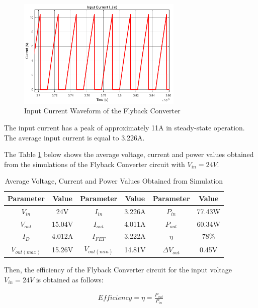 \begin{figure}[H]
\begin{center}
\includegraphics[width=0.7\textwidth]{figures/I_in_24.png}
\caption{Input Current Waveform of the Flyback Converter}
\label{fig:Iin24}
\end{center}
\end{figure}

The input current has a peak of approximately 11A in steady-state operation. The average input current is equal to 3.226A.

The Table \ref{tab:sim24} below shows the average voltage, current and power values obtained from the simulations of the Flyback Converter circuit with $V_{in} = 24V$. 

\begin{table}[H]
    \centering
    \caption{Average Voltage, Current and Power Values Obtained from Simulation}
    \begin{tabular}{|c|c|c|c|c|c|}
    \hline
\textbf{Parameter}   & \textbf{Value}          & \textbf{Parameter}      & \textbf{Value}          & \textbf{Parameter} & \textbf{Value}         \\ \hline
$V_{in}$ & 24V & $I_{in}$ & 3.226A & $P_{in}$ & 77.43W \\ \hline
$V_{out}$ & 15.04V & $I_{out}$ & 4.011A & $P_{out}$ & 60.34W \\ \hline
$I_D$ & 4.012A & $I_{FET}$ & 3.222A & $\eta$ & 78\% \\ \hline
$V_{out(max)}$ & 15.26V & $V_{out(min)}$ & 14.81V & $\Delta V_{out}$ & 0.45V \\ \hline
    \end{tabular}
    \label{tab:sim24}
\end{table}

Then, the efficiency of the Flyback Converter circuit for the input voltage $V_{in} = 24V$ is obtained as follows:

\begin{align}
    Efficiency = \eta = \frac{P_{out}}{P_{in}}
    \label{eqn:eff24}
\end{align}

